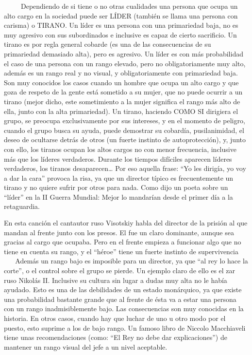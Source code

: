 ~ ~ ~ Dependiendo de si tiene o no otras cualidades una persona que
ocupa un alto cargo en la sociedad puede ser LÍDER (también se llama una
persona con carisma) o TIRANO. Un líder es una persona con una
primariedad baja, no es muy agresivo con sus subordinados e inclusive es
capaz de cierto sacrificio. Un tirano es por regla general cobarde (es
una de las consecuencias de su primariedad demasiado alta), pero es
agresivo. Un líder es con más probabilidad el caso de una persona con un
rango elevado, pero no obligatoriamente muy alto, además es un rango
real y no visual, y obligatoriamente con primariedad baja. Son muy
conocidos los casos cuando un hombre que ocupa un alto cargo y que goza
de respeto de la gente está sometido a su mujer, que no puede ocurrir a
un tirano (mejor dicho, este sometimiento a la mujer significa el rango
más alto de ella, junto con la alta primariedad). Un tirano, haciendo
COMO SI dirigiera el grupo, se preocupa exclusivamente por sus
intereses, y en el momento de peligro, cuando el grupo busca su ayuda,
puede demostrar su cobardía, pusilanimidad, el deseo de ocultarse detrás
de otros (un fuerte instinto de autoprotección), y, junto con ello, los
tiranos ocupan los altos cargos no con menor frecuencia, inclusive más
que los líderes verdaderos. Durante los tiempos difíciles aparecen
líderes verdaderos, los tiranos desaparecen\ldots{} Por eso aquella
frase: ``Yo les dirigía, yo voy a dar la cara'' provoca la risa, ya que
un director típico es frecuentemente un tirano y no quiere sufrir por
otros para nada. Como dijo un poeta sobre un ``líder'' en la II Guerra
Mundial: Mejor lo mandarían desde el primer día a la retaguardia.

En esta canción el cantautor ruso Visotskiy habla del director de la
prisión al que mandan al frente junto con los presos. El fue un claro
dominante, aunque sea gracias al cargo que ocupaba. Pero en el frente
empieza a funcionar algo que no tiene en cuenta su rango, y el ``héroe''
tiene un fuerte instinto de supervivencia\\
\hspace*{0.333em} ~ ~ Además un rango bajo es imposible para un
director, ya que ``al rey lo hace la corte'', o el control sobre el
grupo se pierde. Un ejemplo claro de ello es el zar ruso Nikolás II.
Inclusive su cultura sin lugar a dudas muy alta no le había ayudado.
Esto es una de las debilidades de un estado monárquico, ya que existe
una probabilidad bastante grande que al frente de ésta va a estar una
persona con un rango inadmisiblemente bajo. Las consecuencias son muy
conocidas en la historia. En otros casos, cuando hay que luchar de uno u
otro modo por el puesto, esto suprime a los de bajo rango. Un famoso
libro de Niccolo Macchiaveli tiene unas recomendaciones (como: ``El Rey
no debe dar explicaciones'') de mantener un rango visual del jefe a un
nivel aceptable.

